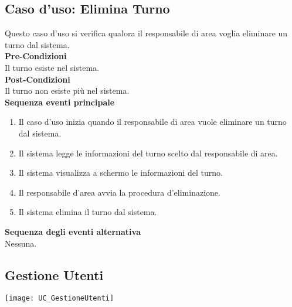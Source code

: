 \documentclass[green, fancy, 11pt]{elegantbook}
\begin{document}
\subsection{Caso d'uso: Elimina Turno}
\noindent
Questo caso d’uso si verifica qualora il responsabile di area voglia eliminare un turno dal sistema.\\
\textbf{Pre-Condizioni}\\
Il turno esiste nel sistema.\\
\textbf{Post-Condizioni}\\
Il turno non esiste più nel sistema.\\
\textbf{Sequenza eventi principale}
\begin{enumerate}
	\item Il caso d’uso inizia quando il responsabile di area vuole eliminare un turno dal sistema.
	\item Il sistema legge le informazioni del turno scelto dal responsabile di area.
	\item Il sistema visualizza a schermo le informazioni del turno.
	\item Il responsabile d’area avvia la procedura d’eliminazione.
	\item Il sistema elimina il turno dal sistema.
\end{enumerate}
\textbf{Sequenza degli eventi alternativa}\\
Nessuna.
\newpage

\subsection{Gestione Utenti}
\texttt{[image: UC\_GestioneUtenti]}
\end{document}
